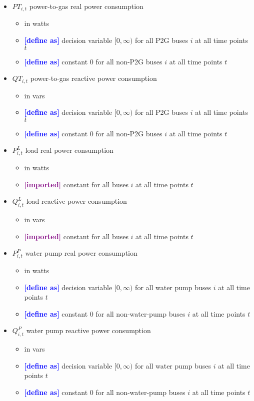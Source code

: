 \documentclass{article}
\newcommand{\define}{\textcolor{blue}{\textbf{[define as] }}}
\newcommand{\imported}{\textcolor{purple}{\textbf{[imported] }}}
\begin{document}
\begin{itemize}
\item $PT_{i,t}$ power-to-gas real power consumption
  \begin{itemize}
  \item in watts
  \item \define decision variable $[0, \infty)$ for all P2G buses $i$ at all
    time points $t$
  \item \define constant $0$ for all non-P2G buses $i$ at all time points $t$
  \end{itemize}

\item $QT_{i,t}$ power-to-gas reactive power consumption
  \begin{itemize}
  \item in vars
  \item \define decision variable $[0, \infty)$ for all P2G buses $i$ at all
    time points $t$
  \item \define constant $0$ for all non-P2G buses $i$ at all time points $t$
  \end{itemize}

\item $P^L_{i,t}$ load real power consumption
  \begin{itemize}
  \item in watts
  \item \imported constant for all buses $i$ at all time points $t$
  \end{itemize}

\item $Q^L_{i,t}$ load reactive power consumption
  \begin{itemize}
  \item in vars
  \item \imported constant for all buses $i$ at all time points $t$
  \end{itemize}

  \item $P^P_{i,t}$ water pump real power consumption
  \begin{itemize}
  \item in watts
  \item \define decision variable $[0, \infty)$ for all water pump buses $i$ at
    all time points $t$
  \item \define constant $0$ for all non-water-pump buses $i$ at all time points
    $t$
  \end{itemize}

\item $Q^P_{i,t}$ water pump reactive power consumption
  \begin{itemize}
  \item in vars
  \item \define decision variable $[0, \infty)$ for all water pump buses $i$ at
    all time points $t$
  \item \define constant $0$ for all non-water-pump buses $i$ at all time points
    $t$
  \end{itemize}


\end{itemize}
\end{document}
